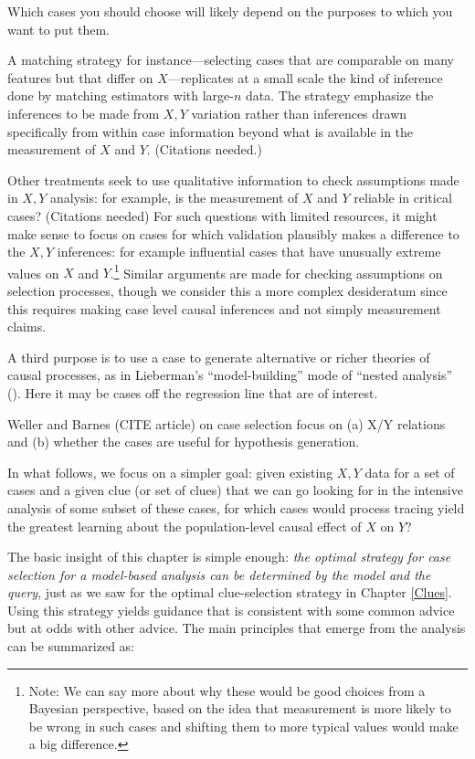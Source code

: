\documentclass[
  12pt,
]{book}
\begin{document}
Which cases you should choose will likely depend on the purposes to which you want to put them.

A matching strategy for instance---selecting cases that are comparable on many features but that differ on \(X\)---replicates at a small scale the kind of inference done by matching estimators with large-\(n\) data. The strategy emphasize the inferences to be made from \(X,Y\) variation rather than inferences drawn specifically from within case information beyond what is available in the measurement of \(X\) and \(Y\). (Citations needed.)

Other treatments seek to use qualitative information to check assumptions made in \(X, Y\) analysis: for example, is the measurement of \(X\) and \(Y\) reliable in critical cases? (Citations needed) For such questions with limited resources, it might make sense to focus on cases for which validation plausibly makes a difference to the \(X,Y\) inferences: for example influential cases that have unusually extreme values on \(X\) and \(Y\).\footnote{Note: We can say more about why these would be good choices from a Bayesian perspective, based on the idea that measurement is more likely to be wrong in such cases and shifting them to more typical values would make a big difference.} Similar arguments are made for checking assumptions on selection processes, though we consider this a more complex desideratum since this requires making case level causal inferences and not simply measurement claims.

A third purpose is to use a case to generate alternative or richer theories of causal processes, as in Lieberman's ``model-building'' mode of ``nested analysis'' (\citet{Lieberman2005nested}). Here it may be cases off the regression line that are of interest.

Weller and Barnes (CITE article) on case selection focus on (a) X/Y relations and (b) whether the cases are useful for hypothesis generation.

In what follows, we focus on a simpler goal: given existing \(X, Y\) data for a set of cases and a given clue (or set of clues) that we can go looking for in the intensive analysis of some subset of these cases, for which cases would process tracing yield the greatest learning about the population-level causal effect of \(X\) on \(Y\)?

The basic insight of this chapter is simple enough: \emph{the optimal strategy for case selection for a model-based analysis can be determined by the model and the query}, just as we saw for the optimal clue-selection strategy in Chapter \ref{Clues}. Using this strategy yields guidance that is consistent with some common advice but at odds with other advice. The main principles that emerge from the analysis can be summarized as:
\end{document}
